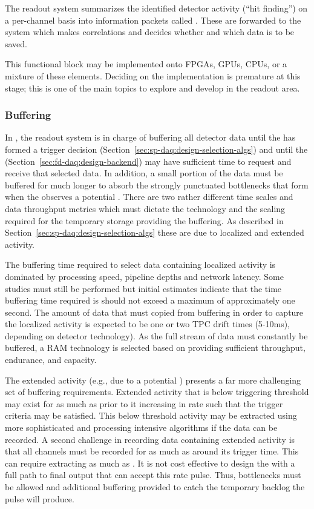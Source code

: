 The readout system summarizes the identified detector activity (``hit finding'') on a per-channel basis into information packets called .  These are forwarded to the  system which makes correlations and decides whether and which data is to be saved.

This functional block may be implemented onto FPGAs, GPUs, CPUs, or a mixture of these elements.
Deciding on the implementation is premature at this stage; this is one of the main topics to explore and develop in the readout area.

\subsubsection{Buffering}

In , the readout system is in charge of buffering all detector data until the  has formed a trigger decision (Section~\ref{sec:sp-daq:design-selection-algs}) and until the  (Section~\ref{sec:fd-daq:design-backend}) may have sufficient time to request and receive that selected data. 
In addition, a small portion of the data must be buffered for much longer to absorb the strongly punctuated bottlenecks that form when the  observes a potential .
There are two rather different time scales and data throughput metrics which must dictate the technology and the scaling required for the temporary storage providing the buffering.
As described in Section~\ref{sec:sp-daq:design-selection-algs} these are due to localized and extended activity.

The buffering time required to select data containing localized activity is dominated by processing speed, pipeline depths and network latency. 
Some studies must still be performed but initial estimates indicate that the time buffering time required is should not exceed a maximum of approximately one second. 
The amount of data that must copied from buffering in order to capture the localized activity is expected to be one or two TPC drift times (5-10\si{\milli\second}), depending on detector technology).
As the full stream of data must constantly be buffered, a RAM technology is selected based on providing sufficient throughput, endurance, and capacity.

The extended activity (e.g., due to a potential ) presents a far more challenging set of buffering requirements.  
Extended activity that is below triggering threshold may exist for as much as \snbpretime prior to it increasing in rate such that the trigger criteria may be satisfied. 
This below threshold activity may be extracted using more sophisticated and processing intensive algorithms if the data can be recorded. 
A second challenge in recording data containing extended activity is that all channels must be recorded for as much as \snbtime around its trigger time.
This can require extracting as much as \spsnbsize.
It is not cost effective to design the  with a full path to final output that can accept this rate pulse.
Thus, bottlenecks must be allowed and additional buffering provided to catch the temporary backlog the pulse will produce.

